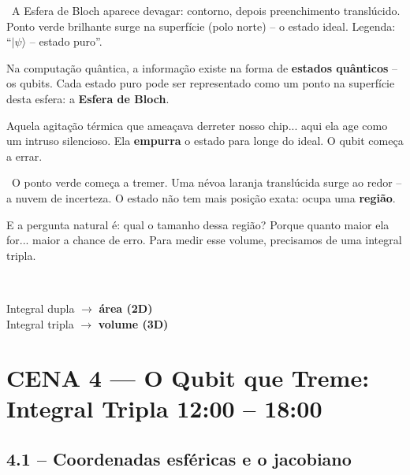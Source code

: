 \begin{visual}
\faFilm\ A Esfera de Bloch aparece devagar: contorno, depois preenchimento translúcido.
Ponto verde brilhante surge na superfície (polo norte) -- o estado ideal.
Legenda: ``$|\psi\rangle$ -- estado puro''.
\end{visual}

\begin{fala}
Na computação quântica, a informação existe na forma de \textbf{estados quânticos}
-- os qubits. Cada estado puro pode ser representado como um ponto na
superfície desta esfera: a \textbf{Esfera de Bloch}.
\end{fala}

\begin{fala}
Aquela agitação térmica que ameaçava derreter nosso chip... aqui ela age como
um intruso silencioso. Ela \textbf{empurra} o estado para longe do ideal.
O qubit começa a errar.
\end{fala}

\begin{visual}
\faFilm\ O ponto verde começa a tremer. Uma névoa laranja translúcida surge ao redor
-- a nuvem de incerteza. O estado não tem mais posição exata: ocupa uma \textbf{região}.
\end{visual}

\begin{fala}
E a pergunta natural é: qual o tamanho dessa região?
Porque quanto maior ela for... maior a chance de erro.
Para medir esse volume, precisamos de uma integral tripla.
\end{fala}

\begin{tela}
\faDesktop\
\begin{center}
\large
Integral dupla $\rightarrow$ \textbf{área (2D)}\\[4pt]
Integral tripla $\rightarrow$ \textbf{volume (3D)}
\end{center}
\end{tela}

\section{CENA 4 --- O Qubit que Treme: Integral Tripla \hfill \normalfont\small\color{corTempo}12:00 -- 18:00}

\subsection{4.1 -- Coordenadas esféricas e o jacobiano}

